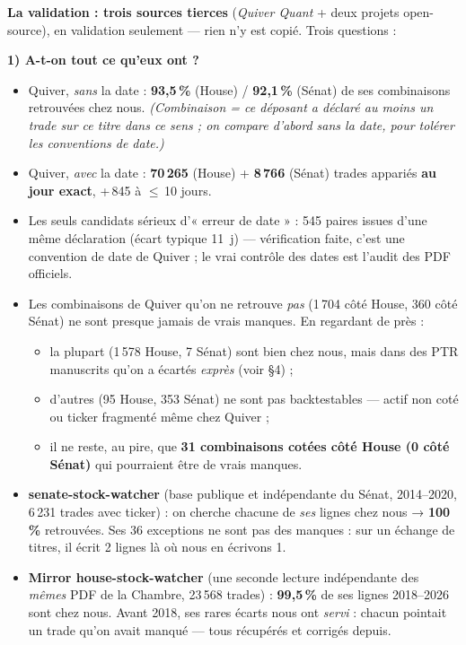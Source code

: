\documentclass[10pt,a4paper]{article}
\begin{document}
\textbf{La validation : trois sources tierces} (\emph{Quiver Quant} + deux projets open-source), en
validation seulement --- rien n'y est copié. Trois questions :

\textbf{1) A-t-on tout ce qu'eux ont ?}
\begin{itemize}
\item Quiver, \emph{sans} la date : \textbf{93{,}5\,\%} (House) / \textbf{92{,}1\,\%} (Sénat) de ses
      combinaisons retrouvées chez nous. \emph{(Combinaison = ce déposant a déclaré au moins un trade sur
      ce titre dans ce sens ; on compare d'abord sans la date, pour tolérer les conventions de date.)}
\item Quiver, \emph{avec} la date : \textbf{70\,265} (House) + \textbf{8\,766} (Sénat) trades appariés
      \textbf{au jour exact}, +\,845 à $\leq$\,10 jours.
\item Les seuls candidats sérieux d'« erreur de date » : 545 paires issues d'une même déclaration
      (écart typique 11~j) --- vérification faite, c'est une convention de date de Quiver ; le vrai
      contrôle des dates est l'audit des PDF officiels.
\item Les combinaisons de Quiver qu'on ne retrouve \emph{pas} (1\,704 côté House, 360 côté Sénat) ne sont
      presque jamais de vrais manques. En regardant de près :
      \begin{itemize}
      \item la plupart (1\,578 House, 7 Sénat) sont bien chez nous, mais dans des PTR manuscrits qu'on a
            écartés \emph{exprès} (voir \S4) ;
      \item d'autres (95 House, 353 Sénat) ne sont pas backtestables --- actif non coté ou ticker
            fragmenté même chez Quiver ;
      \item il ne reste, au pire, que \textbf{31 combinaisons cotées côté House (0 côté Sénat)} qui
            pourraient être de vrais manques.
      \end{itemize}
\item \textbf{senate-stock-watcher} (base publique et indépendante du Sénat, 2014--2020, 6\,231 trades
      avec ticker) : on cherche chacune de \emph{ses} lignes chez nous → \textbf{100\,\%} retrouvées. Ses
      36 exceptions ne sont pas des manques : sur un échange de titres, il écrit 2 lignes là où nous en
      écrivons 1.
\item \textbf{Mirror house-stock-watcher} (une seconde lecture indépendante des \emph{mêmes} PDF de la
      Chambre, 23\,568 trades) : \textbf{99{,}5\,\%} de ses lignes 2018--2026 sont chez nous. Avant 2018,
      ses rares écarts nous ont \emph{servi} : chacun pointait un trade qu'on avait manqué --- tous
      récupérés et corrigés depuis.
\end{itemize}
\end{document}
